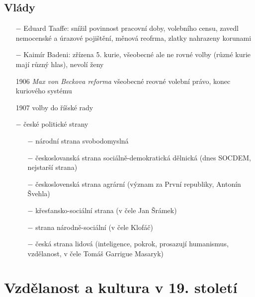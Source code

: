 \documentclass{article}
\begin{document}
\subsection*{Vlády}
\begin{itemize}
    \vspace{-0.5em}
    \setlength\itemsep{0.15em}
    \item[$-$] Eduard Taaffe: snížil povinnost pracovní doby, volebního censu, zavedl nemocenské a úrazové pojištění, měnová reofrma, zlatky nahrazeny korunami
    \item[$-$] Kaimír Badeni: zřízena 5. kurie, všeobecné ale ne rovné volby (různé kurie mají různý hlas), nevolí ženy
    \item[1906] \textit{Max von Beckova reforma} všeobecné reovné volební právo, konec kuriového systému
    \item[1907] volby do říšské rady
    \item[$-$] české politické strany \begin{itemize}
        \vspace{-0.5em}
        \setlength\itemsep{0.15em}
        \item[$-$] národní strana svobodomyslná
        \item[$-$] českoslovanská strana sociálně-demokratická dělnická (dnes SOCDEM, nejstarší strana)
        \item[$-$] československá strana agrární (význam za První republiky, Antonín Švehla)
        \item[$-$] křesťansko-sociální strana (v čele Jan Šrámek)
        \item[$-$] strana národně-sociální (v čele Klofáč)
        \item[$-$] česká strana lidová (inteligence, pokrok, prosazují humanismus, vzdělanost, v čele Tomáš Garrigue Masaryk)
    \end{itemize}
\end{itemize}

\section*{Vzdělanost a kultura v 19. století}
\end{document}
